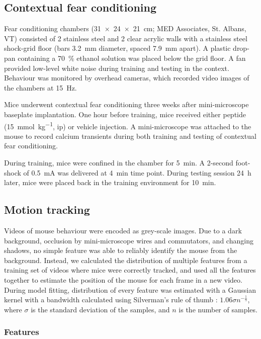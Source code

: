 \subsection{Contextual fear conditioning}
Fear conditioning chambers (\SI{31 x 24 x 21}{\cm}; MED Associates, St. Albans, VT) consisted of 2 stainless steel and 2 clear acrylic walls with a stainless steel shock-grid floor (bars \SI{3.2}{\mm} diameter, spaced \SI{7.9}{\mm} apart). A plastic drop-pan containing a \SI{70}{\percent} ethanol solution was placed below the grid floor. A fan provided low-level white noise during training and testing in the context. Behaviour was monitored by overhead cameras, which recorded video images of the chambers at \SI{15}{\Hz}. 

Mice underwent contextual fear conditioning three weeks after mini-microscope baseplate implantation. One hour before training, mice received either \tglu{} peptide (\SI{15}{\mmol\per\kg}, \gls{ip}) or vehicle injection. A mini-microscope was attached to the mouse to record calcium transients during both training and testing of contextual fear conditioning. 

During training, mice were confined in the chamber for \SI{5}{\minute}. A 2-second foot-shock of \SI{0.5}{\mA} was delivered at \SI{4}{\minute} time point. During testing session \SI{24}{\hour} later, mice were placed back in the training environment for \SI{10}{\minute}. 

\subsection{Motion tracking}
Videos of mouse behaviour were encoded as grey-scale images. Due to a dark background, occlusion by mini-microscope wires and commutators, and changing shadows, no simple feature was able to reliably identify the mouse from the background. Instead, we calculated the distribution of multiple features from a training set of videos where mice were correctly tracked, and used all the features together to estimate the position of the mouse for each frame in a new video. During model fitting, distribution of every feature was estimated with a Gaussian kernel with a bandwidth calculated using Silverman's rule of thumb \citep{silverman86}: $1.06\sigma n^{-\frac{1}{5}}$, where $\sigma$ is the standard deviation of the samples, and $n$ is the number of samples.

\subsubsection{Features} 

